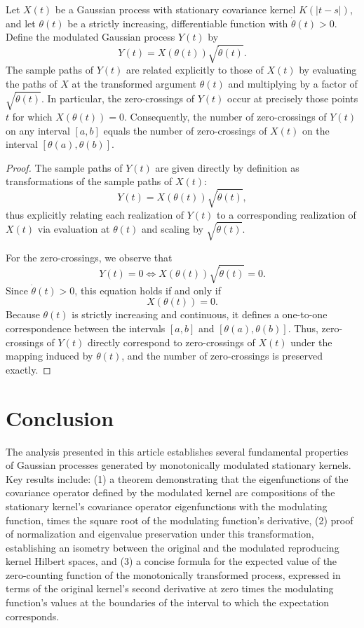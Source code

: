 \documentclass{mc}
\begin{document}
\begin{theorem}
Let $X(t)$ be a Gaussian process with stationary covariance kernel $K(|t - s|)$, and let $\theta(t)$ be a strictly increasing, differentiable function with $\dot{\theta}(t) > 0$. Define the modulated Gaussian process $Y(t)$ by
\[
Y(t) = X(\theta(t)) \sqrt{\dot{\theta}(t)}.
\]
The sample paths of $Y(t)$ are related explicitly to those of $X(t)$ by evaluating the paths of $X$ at the transformed argument $\theta(t)$ and multiplying by a factor of $\sqrt{\dot{\theta}(t)}$. In particular, the zero-crossings of $Y(t)$ occur at precisely those points $t$ for which $X(\theta(t)) = 0$. Consequently, the number of zero-crossings of $Y(t)$ on any interval $[a,b]$ equals the number of zero-crossings of $X(t)$ on the interval $[\theta(a),\theta(b)]$.
\end{theorem}

\begin{proof}
The sample paths of $Y(t)$ are given directly by definition as transformations of the sample paths of $X(t)$:
\[
Y(t) = X(\theta(t)) \sqrt{\dot{\theta}(t)},
\]
thus explicitly relating each realization of $Y(t)$ to a corresponding realization of $X(t)$ via evaluation at $\theta(t)$ and scaling by $\sqrt{\dot{\theta}(t)}$.

For the zero-crossings, we observe that
\[
Y(t) = 0 \iff X(\theta(t)) \sqrt{\dot{\theta}(t)} = 0.
\]
Since $\dot{\theta}(t) > 0$, this equation holds if and only if
\[
X(\theta(t)) = 0.
\]
Because $\theta(t)$ is strictly increasing and continuous, it defines a one-to-one correspondence between the intervals $[a, b]$ and $[\theta(a), \theta(b)]$. Thus, zero-crossings of $Y(t)$ directly correspond to zero-crossings of $X(t)$ under the mapping induced by $\theta(t)$, and the number of zero-crossings is preserved exactly.
\end{proof}


\section{Conclusion}

The analysis presented in this article establishes several fundamental
properties of Gaussian processes generated by monotonically modulated
stationary kernels. Key results include: (1) a theorem demonstrating that the
eigenfunctions of the covariance operator defined by the modulated kernel are 
compositions of the stationary kernel's covariance operator eigenfunctions with 
the modulating function, times the square root of the modulating function's 
derivative, (2) proof of normalization and eigenvalue preservation under this 
transformation, establishing an isometry between the original and the modulated 
reproducing kernel Hilbert spaces, and (3) a concise formula for the expected value 
of the zero-counting function of the monotonically transformed process, expressed 
in terms of the original kernel's second derivative at zero times the modulating function's
values at the boundaries of the interval to which the expectation corresponds.



\end{document}

